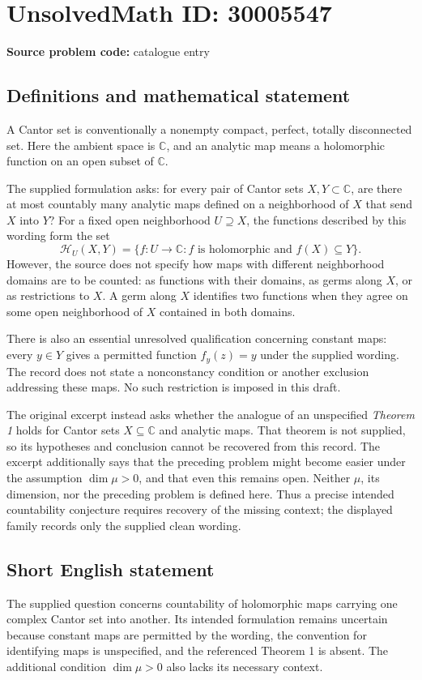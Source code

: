 \documentclass[11pt]{article}
\newcommand{\C}{\mathbb{C}}
\begin{document}
\section*{UnsolvedMath ID: 30005547}
\textbf{Source problem code:} catalogue entry
\subsection{Definitions and mathematical statement}
A Cantor set is conventionally a nonempty compact, perfect, totally disconnected set. Here the ambient space is \(\C\), and an analytic map means a holomorphic function on an open subset of \(\C\).

The supplied formulation asks: for every pair of Cantor sets \(X,Y\subset\C\), are there at most countably many analytic maps defined on a neighborhood of \(X\) that send \(X\) into \(Y\)? For a fixed open neighborhood \(U\supseteq X\), the functions described by this wording form the set
\[
\mathcal H_U(X,Y)=\{f:U\to\C : f\text{ is holomorphic and }f(X)\subseteq Y\}.
\]
However, the source does not specify how maps with different neighborhood domains are to be counted: as functions with their domains, as germs along \(X\), or as restrictions to \(X\). A germ along \(X\) identifies two functions when they agree on some open neighborhood of \(X\) contained in both domains.

There is also an essential unresolved qualification concerning constant maps: every \(y\in Y\) gives a permitted function \(f_y(z)=y\) under the supplied wording. The record does not state a nonconstancy condition or another exclusion addressing these maps. No such restriction is imposed in this draft.

The original excerpt instead asks whether the analogue of an unspecified \emph{Theorem 1} holds for Cantor sets \(X\subseteq\C\) and analytic maps. That theorem is not supplied, so its hypotheses and conclusion cannot be recovered from this record. The excerpt additionally says that the preceding problem might become easier under the assumption \(\dim\mu>0\), and that even this remains open. Neither \(\mu\), its dimension, nor the preceding problem is defined here. Thus a precise intended countability conjecture requires recovery of the missing context; the displayed family records only the supplied clean wording.
\subsection{Short English statement}
The supplied question concerns countability of holomorphic maps carrying one complex Cantor set into another. Its intended formulation remains uncertain because constant maps are permitted by the wording, the convention for identifying maps is unspecified, and the referenced Theorem 1 is absent. The additional condition \(\dim\mu>0\) also lacks its necessary context.
\end{document}
